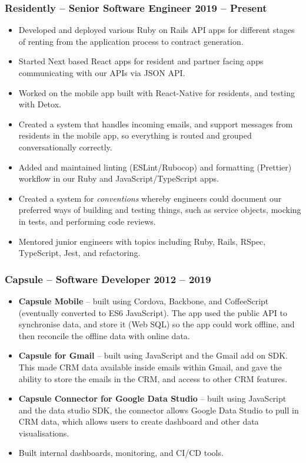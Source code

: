 \documentclass[a4paper]{article}
\newcommand{\datedsubsection}[2]{
  \subsubsection{#1 \hfill \textbf{#2}}
}
\begin{document}
\datedsubsection{\textbf{Residently} -- Senior Software Engineer}{2019 -- Present}
\begin{itemize}
  \item Developed and deployed various Ruby on Rails API apps for different
    stages of renting from the application process to contract generation.
  \item Started Next based React apps for resident and partner facing apps
    communicating with our APIs via JSON API.
  \item Worked on the mobile app built with React-Native for residents, and
    testing with Detox.
  \item Created a system that handles incoming emails, and support messages from
    residents in the mobile app, so everything is routed and grouped
    conversationally correctly.
  \item Added and maintained linting (ESLint/Rubocop) and formatting
    (Prettier) workflow in our Ruby and JavaScript/TypeScript apps.
  \item Created a system for \textit{conventions} whereby engineers could
    document our preferred ways of building and testing things, such as service
    objects, mocking in tests, and performing code reviews.
  \item Mentored junior engineers with topics including Ruby, Rails, RSpec,
    TypeScript, Jest, and refactoring.
\end{itemize}

\datedsubsection{\textbf{Capsule} -- Software Developer}{2012 -- 2019}
\begin{itemize}
  \item \textbf{Capsule Mobile} -- built using Cordova, Backbone, and
    CoffeeScript (eventually converted to ES6 JavaScript). The app used the
    public API to synchronise data, and store it (Web SQL) so the app could work
    offline, and then reconcile the offline data with online data.
  \item \textbf{Capsule for Gmail} -- built using JavaScript and the Gmail add
    on SDK. This made CRM  data available inside emails within Gmail, and gave
    the ability to store the emails in the CRM, and access to other CRM
    features.
  \item \textbf{Capsule Connector for Google Data Studio} -- built using
    JavaScript and the data studio SDK, the connector allows Google Data Studio
    to pull in CRM data, which allows users to create dashboard and other data
    visualisations.
  \item Built internal dashboards, monitoring, and CI/CD tools.
\end{itemize}
\end{document}
